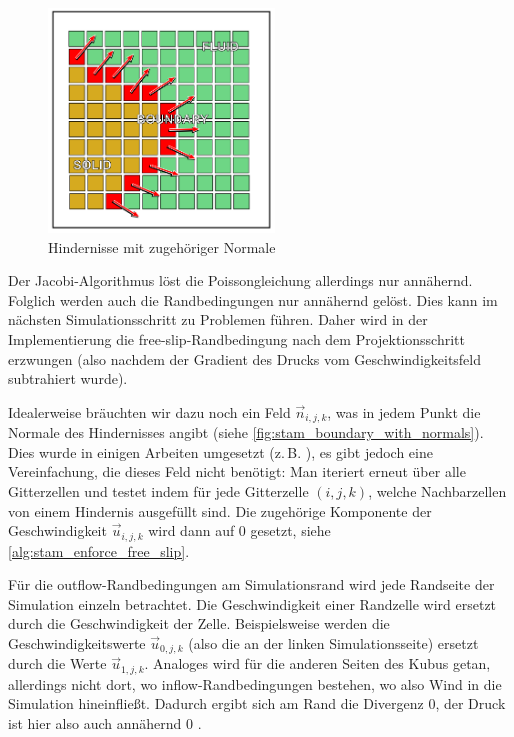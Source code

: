 \begin{figure}[ht]
\centering
\includegraphics[width=6cm]{images/boundary_with_normals}
\caption{Hindernisse mit zugehöriger Normale}
\label{fig:stam_boundary_with_normals}
\end{figure}

Der Jacobi-Algorithmus löst die Poissongleichung allerdings nur annähernd.
Folglich werden auch die Randbedingungen nur annähernd gelöst. Dies kann im
nächsten Simulationsschritt zu Problemen führen. Daher wird in der
Implementierung die free-slip-Randbedingung nach dem Projektionsschritt
erzwungen (also nachdem der Gradient des Drucks vom Geschwindigkeitsfeld
subtrahiert wurde).

Idealerweise bräuchten wir dazu noch ein Feld $\vec{n}_{i,j,k}$, was in jedem
Punkt die Normale des Hindernisses angibt (siehe
\autoref{fig:stam_boundary_with_normals}). Dies wurde in einigen
Arbeiten umgesetzt (z.\,B. \cite{Bordignon}), es gibt jedoch eine Vereinfachung,
die dieses Feld nicht benötigt: Man iteriert erneut über alle
Gitterzellen und testet indem für jede Gitterzelle $(i,j,k)$, welche
Nachbarzellen von einem Hindernis ausgefüllt sind. Die zugehörige
Komponente der Geschwindigkeit $\vec{u}_{i,j,k}$ wird dann auf 0
gesetzt, siehe \autoref{alg:stam_enforce_free_slip}.

Für die outflow-Randbedingungen am Simulationsrand wird jede Randseite der
Simulation einzeln betrachtet. Die Geschwindigkeit einer Randzelle wird ersetzt
durch die Geschwindigkeit der  Zelle.
Beispielsweise werden die Geschwindigkeitswerte $\vec{u}_{0,j,k}$ (also die an
der linken Simulationsseite) ersetzt durch die Werte $\vec{u}_{1,j,k}$. Analoges
wird für die anderen Seiten des Kubus getan, allerdings nicht dort, wo
inflow-Randbedingungen bestehen, wo also Wind in die Simulation hineinfließt.
Dadurch ergibt sich am Rand die Divergenz 0, der Druck ist hier also auch
annähernd 0 .

